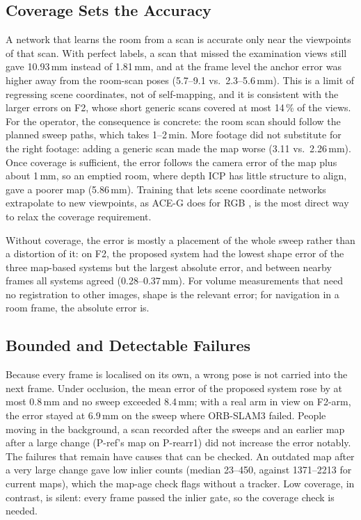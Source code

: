 \documentclass[9pt,shortpaper,twoside,web]{ieeecolor2}
\newcommand{\Pref}{P-ref}
\newcommand{\Prearra}{P-rearr1}
\newcommand{\Ftwo}{F2}
\newcommand{\Farm}{F2-arm}
\begin{document}
\subsection{Coverage Sets the Accuracy}
A network that learns the room from a scan is accurate only near the viewpoints of that scan. With perfect labels, a scan that missed the examination views still gave 10.93\,mm instead of 1.81\,mm, and at the frame level the anchor error was higher away from the room-scan poses (5.7--9.1 vs.\ 2.3--5.6\,mm). This is a limit of regressing scene coordinates, not of self-mapping, and it is consistent with the larger errors on \Ftwo{}, whose short generic scans covered at most 14\,\% of the views. For the operator, the consequence is concrete: the room scan should follow the planned sweep paths, which takes 1--2\,min. More footage did not substitute for the right footage: adding a generic scan made the map worse (3.11 vs.\ 2.26\,mm). Once coverage is sufficient, the error follows the camera error of the map plus about 1\,mm, so an emptied room, where depth ICP has little structure to align, gave a poorer map (5.86\,mm). Training that lets scene coordinate networks extrapolate to new viewpoints, as ACE-G does for RGB \cite{bruns2025aceg}, is the most direct way to relax the coverage requirement.

Without coverage, the error is mostly a placement of the whole sweep rather than a distortion of it: on \Ftwo{}, the proposed system had the lowest shape error of the three map-based systems but the largest absolute error, and between nearby frames all systems agreed (0.28--0.37\,mm). For volume measurements that need no registration to other images, shape is the relevant error; for navigation in a room frame, the absolute error is.

\subsection{Bounded and Detectable Failures}
Because every frame is localised on its own, a wrong pose is not carried into the next frame. Under occlusion, the mean error of the proposed system rose by at most 0.8\,mm and no sweep exceeded 8.4\,mm; with a real arm in view on \Farm{}, the error stayed at 6.9\,mm on the sweep where ORB-SLAM3 failed. People moving in the background, a scan recorded after the sweeps and an earlier map after a large change (\Pref{}'s map on \Prearra{}) did not increase the error notably. The failures that remain have causes that can be checked. An outdated map after a very large change gave low inlier counts (median 23--450, against 1371--2213 for current maps), which the map-age check flags without a tracker. Low coverage, in contrast, is silent: every frame passed the inlier gate, so the coverage check is needed.
\end{document}
